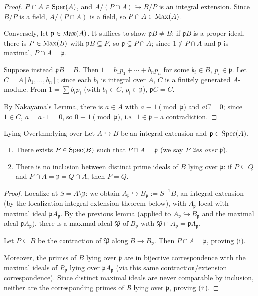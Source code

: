 \begin{proof}
$P \cap A \in \operatorname{Spec}(A)$, and $A/(P\cap A) \hookrightarrow B/P$ is an integral extension. Since $B/P$ is a field, $A/(P\cap A)$ is a field, so $P \cap A \in \operatorname{Max}(A)$.

Conversely, let $\mathfrak p \in \operatorname{Max}(A)$. It suffices to show $\mathfrak p B \neq B$: if $\mathfrak p B$ is a proper ideal, there is $P \in \operatorname{Max}(B)$ with $\mathfrak p B \subseteq P$, so $\mathfrak p \subseteq P \cap A$; since $1 \notin P \cap A$ and $\mathfrak p$ is maximal, $P \cap A = \mathfrak p$.

Suppose instead $\mathfrak p B = B$. Then $1 = b_1p_1 + \cdots + b_np_n$ for some $b_i \in B$, $p_i \in \mathfrak p$. Let $C = A[b_1,\ldots,b_n]$; since each $b_i$ is integral over $A$, $C$ is a finitely generated $A$-module. From $1 = \sum b_ip_i$ (with $b_i \in C$, $p_i \in \mathfrak p$), $\mathfrak p C = C$.

By Nakayama's Lemma, there is $a \in A$ with $a \equiv 1 \pmod{\mathfrak p}$ and $aC=0$; since $1 \in C$, $a = a\cdot 1 = 0$, so $0 \equiv 1 \pmod{\mathfrak p}$, i.e.\ $1 \in \mathfrak p$ -- a contradiction.
\end{proof}

\begin{theorem}{Lying Over}{thm:lying-over}
Let $A \hookrightarrow B$ be an integral extension and $\mathfrak p \in \operatorname{Spec}(A)$.
\begin{enumerate}[label=(\roman*)]
    \item There exists $P \in \operatorname{Spec}(B)$ such that $P \cap A = \mathfrak p$ (we say $P$ \emph{lies over} $\mathfrak p$).
    \item There is no inclusion between distinct prime ideals of $B$ lying over $\mathfrak p$: if $P \subseteq Q$ and $P \cap A = \mathfrak p = Q \cap A$, then $P=Q$.
\end{enumerate}
\end{theorem}

\begin{proof}
Localize at $S = A\setminus\mathfrak p$: we obtain $A_{\mathfrak p} \hookrightarrow B_{\mathfrak p} := S^{-1}B$, an integral extension (by the localization-integral-extension theorem below), with $A_{\mathfrak p}$ local with maximal ideal $\mathfrak pA_{\mathfrak p}$. By the previous lemma (applied to $A_{\mathfrak p} \hookrightarrow B_{\mathfrak p}$ and the maximal ideal $\mathfrak p A_{\mathfrak p}$), there is a maximal ideal $\mathfrak P$ of $B_{\mathfrak p}$ with $\mathfrak P \cap A_{\mathfrak p} = \mathfrak p A_{\mathfrak p}$.

Let $P \subseteq B$ be the contraction of $\mathfrak P$ along $B \to B_{\mathfrak p}$. Then $P \cap A = \mathfrak p$, proving (i).

Moreover, the primes of $B$ lying over $\mathfrak p$ are in bijective correspondence with the maximal ideals of $B_{\mathfrak p}$ lying over $\mathfrak p A_{\mathfrak p}$ (via this same contraction/extension correspondence). Since distinct maximal ideals are never comparable by inclusion, neither are the corresponding primes of $B$ lying over $\mathfrak p$, proving (ii).
\end{proof}

